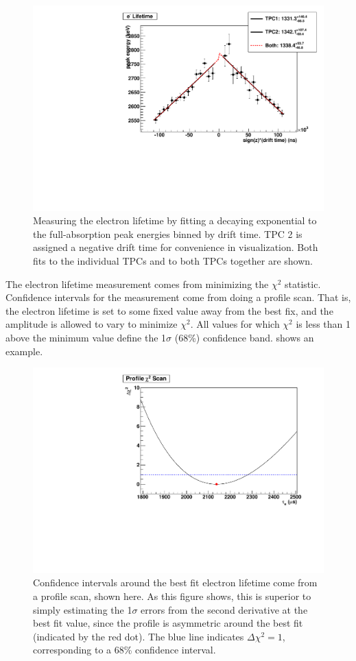 \documentclass[herrin-thesis.tex]{subfiles}
\begin{document}
\begin{figure}[htbp]
\centering
\includegraphics[width=0.8\columnwidth]{./plots/el_run4228_fit.pdf}
\caption[An example fit to exponential attenuation]{Measuring the electron lifetime by fitting a decaying exponential to the full-absorption peak energies binned by drift time. TPC 2 is assigned a negative drift time for convenience in visualization. Both fits to the individual TPCs and to both TPCs together are shown.}
\label{fig:elfit}
\end{figure}

The electron lifetime measurement comes from minimizing the \(\chi^2\) statistic. Confidence intervals for the measurement come from doing a profile scan. That is, the electron lifetime is set to some fixed value away from the best fix, and the amplitude is allowed to vary to minimize \(\chi^2\). All values for which \(\chi^2\) is less than 1 above the minimum value define the 1\(\sigma\) (68\%) confidence band.  shows an example.

\begin{figure}[htbp]
\centering
\includegraphics[width=0.8\columnwidth]{./plots/el_run4252_profile.pdf}
\caption[A profile scan around the best-fit electron lifetime]{Confidence intervals around the best fit electron lifetime come from a profile scan, shown here. As this figure shows, this is superior to simply estimating the 1\(\sigma\) errors from the second derivative at the best fit value, since the profile is asymmetric around the best fit (indicated by the red dot). The blue line indicates \(\Delta\chi^2 = 1\), corresponding to a 68\% confidence interval.}
\label{fig:profileel}
\end{figure}
\end{document}
